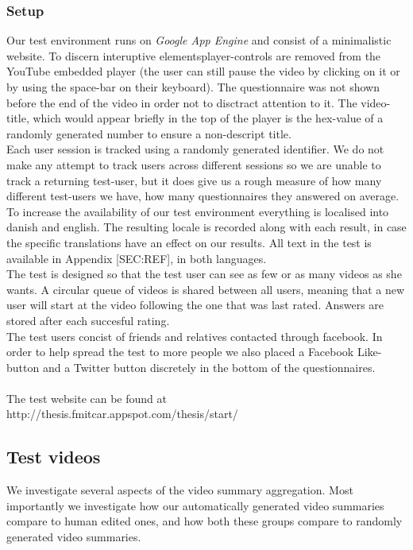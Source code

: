 \subsubsection{Setup}
%
Our test environment runs on \textit{Google App Engine} and consist of a minimalistic website. To discern interuptive elementsplayer-controls are removed from the YouTube embedded player (the user can still pause the video by clicking on it or by using the space-bar on their keyboard). The questionnaire was not shown before the end of the video in order not to disctract attention to it. The video-title, which would appear briefly in the top of the player is the hex-value of a randomly generated number to ensure a non-descript title.\\
Each user session is tracked using a randomly generated identifier. We do not make any attempt to track users across different sessions so we are unable to track a returning test-user, but it does give us a rough measure of how many different test-users we have, how many questionnaires they answered on average.\\
To increase the availability of our test environment everything is localised into danish and english. The resulting locale is recorded along with each result, in case the specific translations have an effect on our results. All text in the test is available in Appendix [SEC:REF], in both languages.\\
The test is designed so that the test user can see as few or as many videos as she wants. A circular queue of videos is shared between all users, meaning that a new user will start at the video following the one that was last rated. Answers are stored after each succesful rating.\\
The test users concist of friends and relatives contacted through facebook. In order to help spread the test to more people we also placed a Facebook Like-button and a Twitter button discretely in the bottom of the questionnaires.\\\\
%
The test website can be found at\\
http://thesis.fmitcar.appspot.com/thesis/start/
%
\subsection{Test videos}
%
We investigate several aspects of the video summary aggregation. Most importantly we investigate how our automatically generated video summaries compare to human edited ones, and how both these groups compare to randomly generated video summaries.
%

